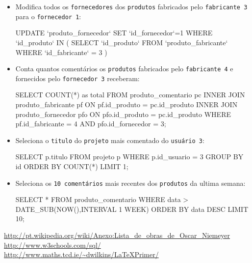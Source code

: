 \documentclass[12pt,a4paper]{article}
\begin{document}
\begin{itemize}
\newpage
\item Modifica todos os \verb+fornecedores+ dos \verb+produtos+ fabricados pelo \verb+fabricante 3+ para o \verb+fornecedor 1+:
\begin{code}
UPDATE `produto_fornecedor`
SET `id_fornecedor`=1
WHERE
    `id_produto` IN
    (
        SELECT `id_produto` FROM `produto_fabricante`
        WHERE `id_fabricante` = 3
    )
\end{code}

\item Conta quantos comentários os \verb+produtos+ fabricados pelo \verb+fabricante 4+ e fornecidos pelo \verb+fornecedor 3+ receberam:
\begin{code}
SELECT
    COUNT(*) as total
FROM
    produto_comentario pc
    INNER JOIN produto_fabricante pf ON pf.id_produto = pc.id_produto
    INNER JOIN produto_fornecedor pfo ON pfo.id_produto = pc.id_produto
WHERE
    pf.id_fabricante = 4
    AND pfo.id_fornecedor = 3;
\end{code}

\item Seleciona o \verb+titulo+ do \verb+projeto+ mais comentado do \verb+usuário 3+:
\begin{code}
SELECT p.titulo
FROM projeto p
WHERE p.id_usuario = 3
GROUP BY id
ORDER BY COUNT(*)
LIMIT 1;
\end{code}

\item Seleciona os \verb+10 comentários+ mais recentes dos \verb+produtos+ da ultima semana:
\begin{code}
SELECT * FROM produto_comentario
WHERE data > DATE_SUB(NOW(),INTERVAL 1 WEEK)
ORDER BY data DESC
LIMIT 10;
\end{code}

\end{itemize}

\newpage
\begin{thebibliography}{99}
\url{http://pt.wikipedia.org/wiki/Anexo:Lista_de_obras_de_Oscar_Niemeyer}
\url{http://www.w3schools.com/sql/}
\url{http://www.maths.tcd.ie/~dwilkins/LaTeXPrimer/}
\end{thebibliography}
\thispagestyle{empty}
\end{document}
